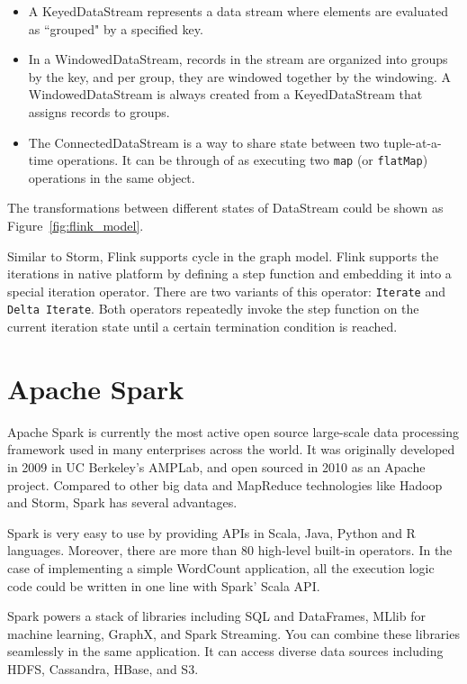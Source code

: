 \begin{itemize}
\item A KeyedDataStream represents a data stream where elements are evaluated as ``grouped" by a specified key. 
\item In a WindowedDataStream, records in the stream are organized into groups by the key, and per group, they are windowed together by the windowing. A WindowedDataStream is always created from a KeyedDataStream that assigns records to groups.
\item The ConnectedDataStream is a way to share state between two tuple-at-a-time operations. It can be through of as executing two \texttt{map} (or \texttt{flatMap}) operations in the same object.
\end{itemize}

The transformations between different states of DataStream could be shown as Figure~\ref{fig:flink_model}. 

Similar to Storm, Flink supports cycle in the graph model. Flink supports the iterations in native platform by defining a step function and embedding it into a special iteration operator. There are two variants of this operator: \texttt{Iterate} and \texttt{Delta Iterate}. Both operators repeatedly invoke the step function on the current iteration state until a certain termination condition is reached.

\section{Apache Spark}
\label{section:spark}

Apache Spark is currently the most active open source large-scale data processing framework used in many enterprises across the world. It was originally developed in 2009 in UC Berkeley's AMPLab, and open sourced in 2010 as an Apache project. Compared to other big data and MapReduce technologies like Hadoop and Storm, Spark has several advantages. 

Spark is very easy to use by providing APIs in Scala, Java, Python and R languages. Moreover, there are more than 80 high-level built-in operators.  In the case of implementing a simple WordCount application, all the execution logic code could be written in one line with Spark' Scala API.

Spark powers a stack of libraries including SQL and DataFrames, MLlib for machine learning, GraphX, and Spark Streaming. You can combine these libraries seamlessly in the same application. It can access diverse data sources including HDFS, Cassandra, HBase, and S3.

